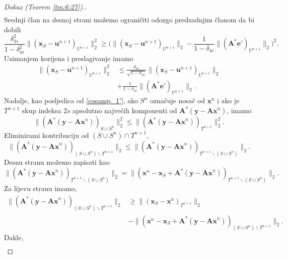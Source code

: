 \documentclass[a4paper,twoside,12pt]{memoir} %
\newcommand{\vect}[1]{\mathbf{#1}}
\renewcommand{\vec}{\vect}
\newcommand{\norm}[1]{\|{#1}\|}
\begin{document}
\begin{proof}[Dokaz (Teorem \ref{tm:6:27}).]
\begin{align*}
    \end{align*}
    Srednji \v{c}lan na desnoj strani mo\v{z}emo ograni\v{c}iti odozgo predzadnjim \v{c}lanom da bi dobili
    \begin{equation*}
        \frac{\delta_{4s}^2}{1-\delta_{4s}^2} \norm{(\vec x_S - \vec u^{n+1})_{\overline{U^{n+1}}}}_2^2 \geq \big( \norm{(\vec x_S - \vec u^{n+1})_{U^{n+1}}}_2 - \frac{1}{1-\delta_{4s}} \norm{(\vec A^* \vec e')_{U^{n+1}}}_2  \big)^2. 
    \end{equation*}
    Uzimanjem korijena i preslagivanje imamo
    \begin{align}
        \norm{(\vec x_S - \vec u^{n+1})_{U^{n+1}}}_2^2 & \leq \frac{\delta_{4s}}{\sqrt{1-\delta_{4s}}}  \norm{(\vec x_S - \vec u^{n+1})_{\overline{U^{n+1}}}}_2 \nonumber \\[0.5em]
        & + \frac{1}{1-\delta_{4s}} \norm{(\vec A^* \vec e')_{U^{n+1}}}_2.\label{6:50} 
    \end{align}
    Nadalje, kao posljedica od \eqref{cosamp_1'}, ako $S^n$ ozna\v{c}uje nosa\v{c} od $\vec x^n$ i ako je $T^{n+1}$ skup indeksa $2s$ apsolutno najve\'cih komponenti od $\vec A^*(\vec y - \vec{Ax}^n)$, imamo
    \begin{equation*}
        \norm{(\vec A^*(\vec y - \vec {Ax}^n))_{S \cup S^n}}_2^2 \leq \norm{(\vec A^*(\vec y - \vec{Ax}^n))_{T^{n+1}}}_2^2.
    \end{equation*}
    Eliminirami kontribuciju od $(S \cup S^n) \cap T^{n+1}$,
    \begin{equation*}
        \norm{(\vec A^*(\vec y - \vec{Ax}^n))_{(S \cup S^n) \backslash T^{n+1}}}_2 \leq \norm{(\vec A^*(\vec y - \vec {Ax}^n))_{T^{n+1} \backslash (S \cup S^n)}}_2.
    \end{equation*}
    Desnu stranu mo\v{z}emo zapisati kao
    \begin{equation*}
        \norm{(\vec A^*(\vec y - \vec {Ax}^n))_{T^{n+1} \backslash (S \cup S^n)}}_2 = \norm{(\vec x^n - \vec x_S + \vec A^*(\vec y - \vec {Ax}^n))_{T^{n+1} \backslash (S \cup S^n)}}_2.
    \end{equation*}
    Za lijevu stranu imamo,
    \begin{align*}
        \norm{(\vec A^*(\vec y - \vec{Ax}^n))_{(S \cup S^n) \backslash T^{n+1}}}_2 & \geq \norm{(\vec x_S - \vec x^n)_{\overline{T^{n+1}}}}_2\\[0.5em]
        & - \norm{(\vec x^n - \vec x_S + \vec A^*(\vec y - \vec {Ax}^n))_{(S \cup S^n) \backslash T^{n+1}}}_2.
    \end{align*}
    Dakle,
    \begin{align*}

\end{align*}
\end{proof}
\end{document}
